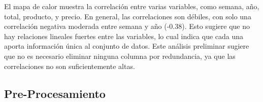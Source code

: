 		
		
		
		
		El mapa de calor muestra la correlación entre varias variables, como semana, año, total, producto, y precio. En general, las correlaciones son débiles, con solo una correlación negativa moderada entre semana y año (-0.38). Esto sugiere que no hay relaciones lineales fuertes entre las variables, lo cual indica que cada una aporta información única al conjunto de datos. Este análisis preliminar sugiere que no es necesario eliminar ninguna columna por redundancia, ya que las correlaciones no son suficientemente altas.
		
		
		\subsection{Pre-Procesamiento}

